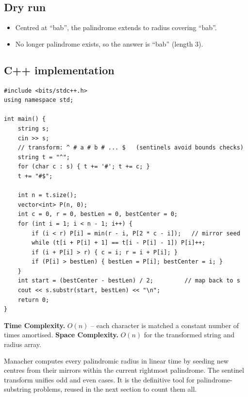 \subsection*{Dry run}


\begin{itemize}
  \item Centred at ``bab'', the palindrome extends to radius covering
        ``bab''.
  \item No longer palindrome exists, so the answer is ``bab'' (length
        $3$).
\end{itemize}

\subsection*{C++ implementation}

\begin{lstlisting}
#include <bits/stdc++.h>
using namespace std;

int main() {
    string s;
    cin >> s;
    // transform: ^ # a # b # ... $   (sentinels avoid bounds checks)
    string t = "^";
    for (char c : s) { t += '#'; t += c; }
    t += "#$";

    int n = t.size();
    vector<int> P(n, 0);
    int c = 0, r = 0, bestLen = 0, bestCenter = 0;
    for (int i = 1; i < n - 1; i++) {
        if (i < r) P[i] = min(r - i, P[2 * c - i]);   // mirror seed
        while (t[i + P[i] + 1] == t[i - P[i] - 1]) P[i]++;
        if (i + P[i] > r) { c = i; r = i + P[i]; }
        if (P[i] > bestLen) { bestLen = P[i]; bestCenter = i; }
    }
    int start = (bestCenter - bestLen) / 2;         // map back to s
    cout << s.substr(start, bestLen) << "\n";
    return 0;
}
\end{lstlisting}

\begin{complexitybox}
\textbf{Time Complexity.} $O(n)$ -- each character is matched a constant
number of times amortised. \textbf{Space Complexity.} $O(n)$ for the
transformed string and radius array.
\end{complexitybox}

\begin{takeawaybox}
Manacher computes every palindromic radius in linear time by seeding new
centres from their mirrors within the current rightmost palindrome. The
sentinel transform unifies odd and even cases. It is the definitive tool
for palindrome-substring problems, reused in the next section to count
them all.
\end{takeawaybox}
